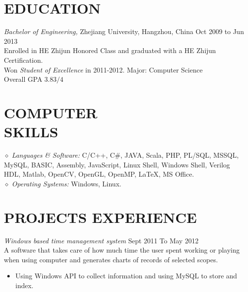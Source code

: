 \documentclass[line,margin]{res}
\begin{document}
\address{Cellphone:\sl 15216861267}
\address{Email:\sl TaoYeuanWang@gmail.com}
\address{Email:\sl TaoYeuanWang@gmail.com}


\begin{resume}


\section{EDUCATION} {\sl Bachelor of Engineering,} Zhejiang University, Hangzhou, China \hfill Oct 2009 to Jun 2013\\
                Enrolled in HE Zhijun Honored Class and graduated with a HE Zhijun Certification.\\
                Won {\sl Student of Excellence} in 2011-2012.
                Major: Computer Science \\
                Overall GPA $3.83/4$

\section{COMPUTER \\ SKILLS} {$\diamond$ \sl Languages \& Software:} C/C++, C\#, JAVA, Scala, PHP, PL/SQL, MSSQL, MySQL, BASIC, Assembly, JavaScript, Linux Shell, Windows Shell, Verilog HDL, Matlab, OpenCV, OpenGL, OpenMP, \LaTeX, MS Office. \\
                {$\diamond$ \sl Operating Systems:} Windows, Linux.

\section{PROJECTS EXPERIENCE} {\sl Windows based time management system} \hfill Sept 2011 To May 2012 \\
                A software that takes care of how much time the user spent working or playing when using computer and generates charts of records of selected scopes.
                 \begin{itemize}  \itemsep -2pt %
                 \item Using Windows API to collect information and using MySQL to store and index.
                 \end{itemize}


\end{resume}
\end{document}
